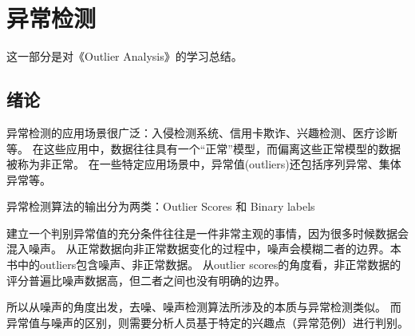 \chapter{异常检测}
这一部分是对《Outlier Analysis》的学习总结。

\section{绪论}
异常检测的应用场景很广泛：入侵检测系统、信用卡欺诈、兴趣检测、医疗诊断等。
在这些应用中，数据往往具有一个“正常”模型，而偏离这些正常模型的数据被称为非正常。
在一些特定应用场景中，异常值(outliers)还包括序列异常、集体异常等。

异常检测算法的输出分为两类：Outlier Scores 和 Binary labels

建立一个判别异常值的充分条件往往是一件非常主观的事情，因为很多时候数据会混入{\hei 噪声}。
从正常数据向非正常数据变化的过程中，噪声会模糊二者的边界。本书中的outliers包含噪声、非正常数据。
从outlier scores的角度看，非正常数据的评分普遍比噪声数据高，但二者之间也没有明确的边界。

所以从噪声的角度出发，去噪、噪声检测算法所涉及的本质与异常检测类似。
而异常值与噪声的区别，则需要分析人员基于特定的兴趣点（异常范例）进行判别。